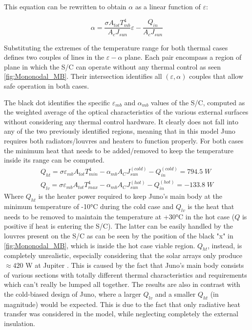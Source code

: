 This equation can be rewritten to obtain $\alpha$ as a linear function of $\varepsilon$:

\begin{equation}
    \alpha = \frac{\sigma A_{tot} T_{mb}^4}{A_c J_{sun}}\varepsilon - \frac{Q_{in}}{A_c J_{sun}}
    \label{eq:eps_alpha_relation}
\end{equation}

Substituting the extremes of the temperature range for both thermal cases defines two couples of lines in the $\varepsilon-\alpha$ plane. Each pair encompass a region of plane in which the S/C can operate without any thermal control as seen \autoref{fig:Mononodal_MB}. Their intersection identifies all $(\varepsilon, \alpha)$ couples that allow safe operation in both cases.


The black dot identifies the specific $\varepsilon_{mb}$ and $\alpha_{mb}$ values of the S/C, computed as the weighted average of the optical characteristics of the various external surfaces without considering any thermal control hardware. It clearly does not fall into any of the two previously identified regions, meaning that in this model Juno requires both radiators/louvres and heaters to function properly.
For both cases the minimum heat that needs to be added/removed to keep the temperature inside its range can be computed.
\begin{gather}
    Q_{ht} = \sigma \varepsilon_{mb} A_{tot} T_{min}^4 - \alpha_{mb} A_C J_{sun}^{(cold)} - Q_{in}^{(cold)} = 794.5 \; W
    \label{eq:mb_mono_cold_heat}
    \\
    Q_{lv} = \sigma \varepsilon_{mb} A_{tot} T_{max}^4 - \alpha_{mb} A_C J_{sun}^{(hot)} - Q_{in}^{(hot)} = -133.8 \; W
    \label{eq:mb_mono_hot_heat}
\end{gather}
Where $Q_{ht}$ is the heater power required to keep Juno's main body at the minimum temperature of -10°C during the cold case and $Q_{lv}$ is the heat that needs to be removed to maintain the temperature at +30°C in the hot case ($Q$ is positive if heat is entering the S/C). The latter can be easily handled by the louvres present on the S/C as can be seen by the position of the black "x" in \autoref{fig:Mononodal_MB}, which is inside the hot case viable region. $Q_{ht}$, instead, is completely unrealistic, especially considering that the solar arrays only produce $\approx 420$ W at Jupiter \cite{solar_panels_coef}. This is caused by the fact that Juno's main body consists of various sections with totally different thermal characteristics and requirements which can't really be lumped all together. The results are also in contrast with the cold-biased design of Juno, where a larger $Q_{lv}$ and a smaller $Q_{ht}$ (in magnitude) would be expected. This is due to the fact that only radiative heat transfer was considered in the model, while neglecting completely the external insulation. 


